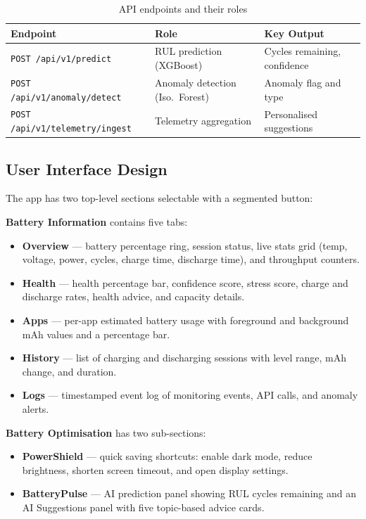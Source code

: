 \documentclass[12pt,a4paper]{report}
\begin{document}
\begin{table}[H]
\caption{API endpoints and their roles}
\centering
\small
\begin{tabular}{lll}
\toprule
\textbf{Endpoint} & \textbf{Role} & \textbf{Key Output}\\
\midrule
\texttt{POST /api/v1/predict}         & RUL prediction (XGBoost)        & Cycles remaining, confidence\\
\texttt{POST /api/v1/anomaly/detect}  & Anomaly detection (Iso.\ Forest) & Anomaly flag and type\\
\texttt{POST /api/v1/telemetry/ingest}& Telemetry aggregation            & Personalised suggestions\\
\bottomrule
\end{tabular}
\end{table}

\subsection{User Interface Design}

The app has two top-level sections selectable with a segmented button:

\textbf{Battery Information} contains five tabs:
\begin{itemize}
  \item \textbf{Overview} — battery percentage ring, session status, live stats
        grid (temp, voltage, power, cycles, charge time, discharge time), and
        throughput counters.
  \item \textbf{Health} — health percentage bar, confidence score, stress score,
        charge and discharge rates, health advice, and capacity details.
  \item \textbf{Apps} — per-app estimated battery usage with foreground and
        background mAh values and a percentage bar.
  \item \textbf{History} — list of charging and discharging sessions with level
        range, mAh change, and duration.
  \item \textbf{Logs} — timestamped event log of monitoring events, API calls,
        and anomaly alerts.
\end{itemize}

\textbf{Battery Optimisation} has two sub-sections:
\begin{itemize}
  \item \textbf{PowerShield} — quick saving shortcuts: enable dark mode, reduce
        brightness, shorten screen timeout, and open display settings.
  \item \textbf{BatteryPulse} — AI prediction panel showing RUL cycles remaining
        and an AI Suggestions panel with five topic-based advice cards.
\end{itemize}
\end{document}
